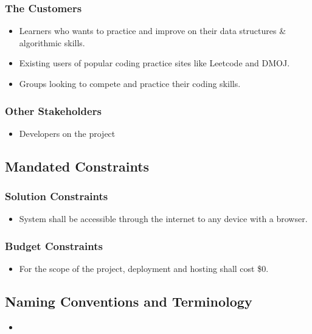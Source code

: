 \documentclass[12pt, titlepage]{article}
\begin{document}
\subsubsection{The Customers}
\begin{itemize}
    \item Learners who wants to practice and improve on their data structures \& algorithmic skills.
    \item Existing users of popular coding practice sites like Leetcode and DMOJ.
    \item Groups looking to compete and practice their coding skills.
\end{itemize}

\subsubsection{Other Stakeholders}
\begin{itemize}
    \item Developers on the project
\end{itemize}

\subsection{Mandated Constraints}

\subsubsection{Solution Constraints}
\begin{itemize}
    \item System shall be accessible through the internet to any device with a browser.
\end{itemize}

\subsubsection{Budget Constraints}
\begin{itemize}
    \item For the scope of the project, deployment and hosting shall cost \$0.
\end{itemize}

\subsection{Naming Conventions and Terminology}
\begin{itemize}
    \item 
\end{itemize}
\end{document}
